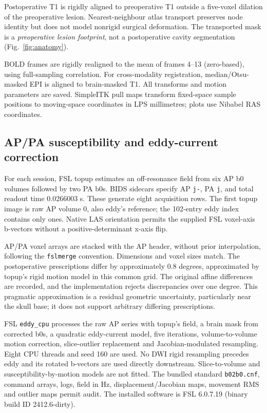 \documentclass[11pt,a4paper]{article}
\begin{document}
Postoperative T1 is rigidly aligned to preoperative T1 outside a five-voxel dilation of the preoperative lesion. Nearest-neighbour atlas transport preserves node identity but does not model nonrigid surgical deformation. The transported mask is a \emph{preoperative lesion footprint}, not a postoperative cavity segmentation (Fig.~\ref{fig:anatomy}).

BOLD frames are rigidly realigned to the mean of frames 4--13 (zero-based), using full-sampling correlation. For cross-modality registration, median/Otsu-masked EPI is aligned to brain-masked T1. All transforms and motion parameters are saved. SimpleITK pull maps transform fixed-space sample positions to moving-space coordinates in LPS millimetres; plots use Nibabel RAS coordinates.

\subsection{AP/PA susceptibility and eddy-current correction}
For each session, FSL topup \citep{andersson2003} estimates an off-resonance field from six AP b0 volumes followed by two PA b0s. BIDS sidecars specify AP \texttt{j-}, PA \texttt{j}, and total readout time 0.0266003 s. These generate eight acquisition rows. The first topup image is raw AP volume 0, also eddy's reference; the 102-entry eddy index contains only ones. Native LAS orientation permits the supplied FSL voxel-axis b-vectors without a positive-determinant x-axis flip.

AP/PA voxel arrays are stacked with the AP header, without prior interpolation, following the \texttt{fslmerge} convention. Dimensions and voxel sizes match. The postoperative prescriptions differ by approximately 0.8 degrees, approximated by topup's rigid motion model in this common grid. The original affine differences are recorded, and the implementation rejects discrepancies over one degree. This pragmatic approximation is a residual geometric uncertainty, particularly near the skull base; it does not support arbitrary differing prescriptions.

FSL \texttt{eddy\_cpu} \citep{andersson2016} processes the raw AP series with topup's field, a brain mask from corrected b0s, a quadratic eddy-current model, five iterations, volume-to-volume motion correction, slice-outlier replacement and Jacobian-modulated resampling. Eight CPU threads and seed 160 are used. No DWI rigid resampling precedes eddy and its rotated b-vectors are used directly downstream. Slice-to-volume and susceptibility-by-motion models are not fitted. The bundled standard \texttt{b02b0.cnf}, command arrays, logs, field in Hz, displacement/Jacobian maps, movement RMS and outlier maps permit audit. The installed software is FSL 6.0.7.19 (binary build ID 2412.6-dirty).
\end{document}
